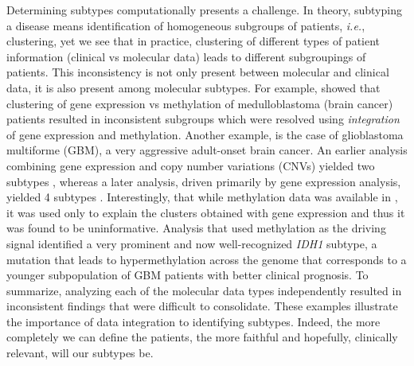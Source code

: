 \documentclass[5p]{elsarticle}
\newcommand{\ie}{\emph{i.e.}\xspace}
\newcommand{\rev}[1]{{\color{black}#1}}
\begin{document}
Determining subtypes computationally presents a challenge. In theory, subtyping a disease means identification of homogeneous subgroups of patients, \ie, clustering, yet we see that in practice, clustering of different types of patient information (clinical vs molecular data) leads to different subgroupings of patients. This inconsistency is not only present between molecular and clinical data, it is also present among molecular subtypes. For example, \cite{Cavalli:2017} showed that clustering of gene expression vs methylation of medulloblastoma (brain cancer) patients resulted in inconsistent subgroups which were resolved using \emph{integration} of gene expression and methylation. Another example, is the case of glioblastoma \rev{multiforme} (GBM), a very aggressive adult-onset brain cancer. An earlier analysis combining gene expression and \rev{copy number variations (CNVs)} yielded two subtypes \cite{Nigro:2005}, whereas a later analysis, driven primarily by gene expression analysis, yielded 4 subtypes \cite{Verhaak:2010}. Interestingly, that while methylation data was available in \cite{Verhaak:2010}, it was used only to explain the clusters obtained with gene expression and thus it was found to be uninformative. Analysis that used methylation as the driving signal identified a very prominent and now \rev{well-recognized} \textit{IDH1} subtype, a mutation that leads to \rev{hypermethylation across} the genome that corresponds to a younger subpopulation of GBM patients with better clinical prognosis. To summarize, analyzing each of the molecular data types independently resulted in inconsistent findings that were difficult to consolidate. These examples illustrate the importance of data integration to identifying subtypes. Indeed, the more completely we can define the patients, the more faithful and hopefully, clinically relevant, will our subtypes be.
\end{document}

